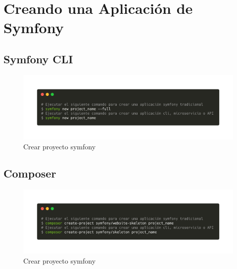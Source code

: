 \section{Creando una Aplicación de Symfony}
\subsection{Symfony CLI}
\begin{figure}[htbp]
    \centering
    \includegraphics[width=\textwidth]{assets/symfony_new.png}
    \caption{Crear proyecto symfony}
    \label{fig:symfony_new}
\end{figure}
\subsection{Composer}
\begin{figure}[htbp]
    \centering
    \includegraphics[width=\textwidth]{assets/composer_create.png}
    \caption{Crear proyecto symfony}
    \label{fig:composer_create}
\end{figure}
